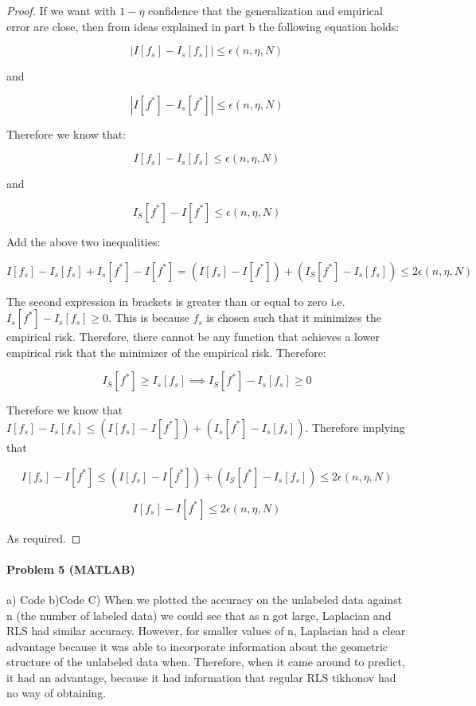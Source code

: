 \documentclass[12pt]{report}
\begin{document}
\begin{proof}

If we want with $1 - \eta$ confidence that the generalization and empirical error are close, then from ideas explained in part b the following equation holds:

$$ | I[f_s] - I_s[f_s] | \leq \epsilon(n, \eta, N)$$

and

$$ | I[f^*] - I_s[f^*] | \leq \epsilon(n, \eta, N)$$

Therefore we know that:

$$ I[f_s] - I_s[f_s] \leq \epsilon(n, \eta, N)$$

and

$$ I_S[f^*] - I[f^*] \leq \epsilon(n, \eta, N)$$

Add the above two inequalities:

$$I[f_s] - I_s[f_s] +  I_s[f^*] - I[f^*] = (I[f_s] - I[f^*]) + (I_S[f^*] - I_s[f_s])  \leq 2\epsilon(n, \eta, N)$$

The second expression in brackets is greater than or equal to zero i.e. $I_s[f^*] - I_s[f_s] \geq 0$. This is because $f_s$ is chosen such that it minimizes the empirical risk. Therefore, there cannot be any function that achieves a lower empirical risk that the minimizer of the empirical risk. Therefore:

 $$I_S[f^*] \geq I_s[f_s] \implies I_S[f^*] - I_s[f_s] \geq 0$$
 
 Therefore we know that $I[f_s] - I_s[f_s] \leq (I[f_s] - I[f^*]) + (I_s[f^*] - I_s[f_s]) $. Therefore implying that 
 
 $$I[f_s] - I[f^*] \leq (I[f_s] - I[f^*]) + (I_S[f^*] - I_s[f_s])  \leq 2\epsilon(n, \eta, N)$$
 
  $$I[f_s] - I[f^*] \leq 2\epsilon(n, \eta, N)$$
 
 As required.

\end{proof}

\paragraph{Problem 5 (MATLAB)}
a) Code
b)Code
C) When we plotted the accuracy on the unlabeled data against n (the number of labeled data) we could see that as n got large, Laplacian and RLS had similar accuracy. However, for smaller values of n, Laplacian had a clear advantage because it was able to incorporate information about the geometric structure of the unlabeled data when. Therefore, when it came around to predict, it had an advantage, because it had information that regular RLS tikhonov had no way of obtaining.
\end{document}
